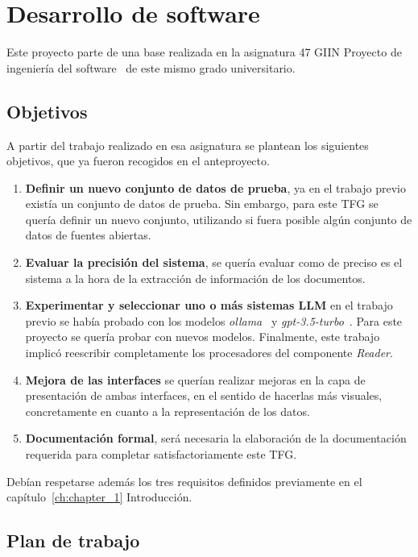 \section{Desarrollo de software}\label{sec:desarrollo_de_software}

Este proyecto parte de una base realizada en la asignatura 47 GIIN Proyecto de ingeniería del
software~\cite{url_viu_47_proyecto} de este mismo grado universitario.

\subsection{Objetivos}

A partir del trabajo realizado en esa asignatura se plantean los siguientes objetivos, que ya fueron recogidos en el
anteproyecto.

\begin{enumerate}
    \item \textbf{Definir un nuevo conjunto de datos de prueba},
    ya en el trabajo previo existía un conjunto de datos de prueba.
    Sin embargo, para este TFG se quería definir un nuevo conjunto, utilizando si fuera posible algún conjunto de
    datos de fuentes abiertas.
    \item \textbf{Evaluar la precisión del sistema},
    se quería evaluar como de preciso es el sistema a la hora de la extracción de información de los documentos.
    \item \textbf{Experimentar y seleccionar uno o más sistemas LLM}
    en el trabajo previo se había probado con los modelos \textit{ollama}~\cite{url_ollama} y
    \textit{gpt-3.5-turbo}~\cite{url_gpt3_5}.
    Para este proyecto se quería probar con nuevos modelos.
    Finalmente, este trabajo implicó reescribir completamente los procesadores del componente \textit{Reader}.
    \item \textbf{Mejora de las interfaces}
    se querían realizar mejoras en la capa de presentación de ambas interfaces, en el sentido de hacerlas más
    visuales, concretamente en cuanto a la representación de los datos.
    \item \textbf{Documentación formal},
    será necesaria la elaboración de la documentación requerida para completar satisfactoriamente este TFG.
\end{enumerate}

Debían respetarse además los tres requisitos definidos previamente en el capítulo~\ref{ch:chapter_1} Introducción.

\subsection{Plan de trabajo}

